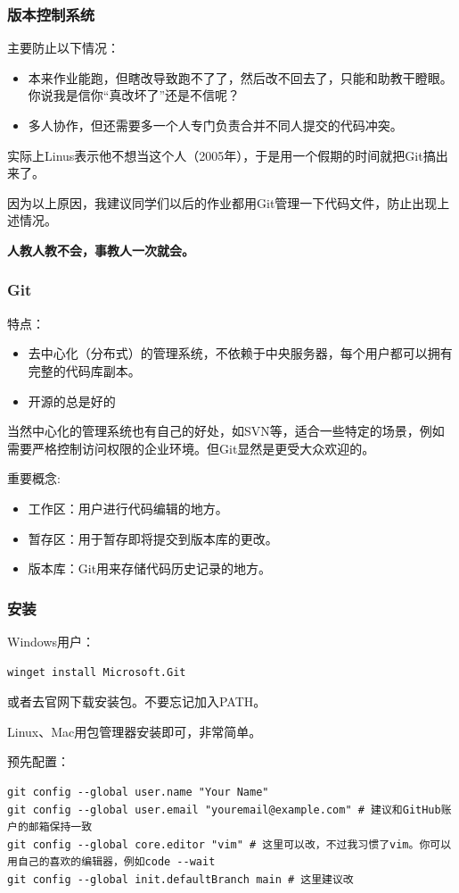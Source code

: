\documentclass{ctexbeamer}
\begin{document}
\begin{frame}
    \frametitle{版本控制系统}

    主要防止以下情况：
    \begin{itemize}
        \item 本来作业能跑，但瞎改导致跑不了了，然后改不回去了，只能和助教干瞪眼。你说我是信你“真改坏了”还是不信呢？
        \item 多人协作，但还需要多一个人专门负责合并不同人提交的代码冲突。
    \end{itemize}

    实际上Linus表示他不想当这个人（2005年），于是用一个假期的时间就把Git搞出来了。

    \hspace{2em}

    因为以上原因，我建议同学们以后的作业都用Git管理一下代码文件，防止出现上述情况。

    \textbf{人教人教不会，事教人一次就会。}

\end{frame}

\begin{frame}
    \frametitle{Git}

    特点：
    \begin{itemize}
        \item 去中心化（分布式）的管理系统，不依赖于中央服务器，每个用户都可以拥有完整的代码库副本。
        \item 开源的总是好的
    \end{itemize}
    当然中心化的管理系统也有自己的好处，如SVN等，适合一些特定的场景，例如需要严格控制访问权限的企业环境。但Git显然是更受大众欢迎的。

    \hspace{2em}

    重要概念:
    \begin{itemize}
        \item 工作区：用户进行代码编辑的地方。
        \item 暂存区：用于暂存即将提交到版本库的更改。
        \item 版本库：Git用来存储代码历史记录的地方。
    \end{itemize}
\end{frame}

\begin{frame}[fragile]
    \frametitle{安装}

    Windows用户：
\begin{verbatim}
winget install Microsoft.Git
\end{verbatim}
    或者去官网下载安装包。\alert{不要忘记加入PATH。}

    Linux、Mac用包管理器安装即可，非常简单。

    预先配置：
\begin{verbatim}
git config --global user.name "Your Name"
git config --global user.email "youremail@example.com" # 建议和GitHub账户的邮箱保持一致
git config --global core.editor "vim" # 这里可以改，不过我习惯了vim。你可以用自己的喜欢的编辑器，例如code --wait
git config --global init.defaultBranch main # 这里建议改
\end{verbatim}

\end{frame}
\end{document}
